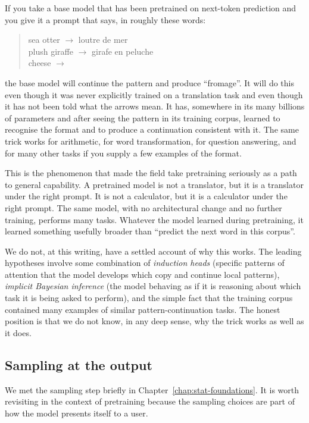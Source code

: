 If you take a base model that has been pretrained on next-token
prediction and you give it a prompt that says, in roughly these
words:

\begin{quote}
sea otter $\to$ loutre de mer\\
plush giraffe $\to$ girafe en peluche\\
cheese $\to$
\end{quote}

\noindent the base model will continue the pattern and produce
``fromage''. It will do this even though it was never explicitly
trained on a translation task and even though it has not been
told what the arrows mean. It has, somewhere in its many
billions of parameters and after seeing the pattern in its
training corpus, learned to recognise the format and to produce
a continuation consistent with it. The same trick works for
arithmetic, for word transformation, for question answering, and
for many other tasks if you supply a few examples of the format.

This is the phenomenon that made the field take pretraining
seriously as a path to general capability. A pretrained model
is not a translator, but it is a translator under the right
prompt. It is not a calculator, but it is a calculator under the
right prompt. The same model, with no architectural change and
no further training, performs many tasks. Whatever the model
learned during pretraining, it learned something usefully
broader than ``predict the next word in this corpus''.

We do not, at this writing, have a settled account of why this
works. The leading hypotheses involve some combination of
\emph{induction heads} (specific patterns of attention that the
model develops which copy and continue local patterns),
\emph{implicit Bayesian inference} (the model behaving as if it
is reasoning about which task it is being asked to perform),
and the simple fact that the training corpus contained many
examples of similar pattern-continuation tasks. The honest
position is that we do not know, in any deep sense, why the
trick works as well as it does.

\subsection*{Sampling at the output}

We met the sampling step briefly in Chapter~\ref{chap:stat-foundations}. It is worth
revisiting in the context of pretraining because the sampling
choices are part of how the model presents itself to a user.

